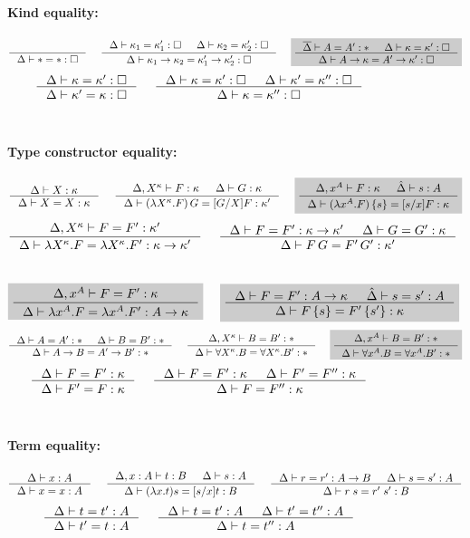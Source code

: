 \begin{figure}
\begin{framed}
\paragraph{Kind equality:}
\[ \inference{}{\Delta |- * = *:\square}
 ~~~~
   \inference{ \Delta |- \kappa_1 = \kappa_1' : \square
             & \Delta |- \kappa_2 = \kappa_2' : \square }
             {\Delta |- \kappa_1 -> \kappa_2 = \kappa_1' -> \kappa_2' : \square}
 ~~~~ \newFi{
   \inference{\overline\Delta |- A=A':* & \Delta |- \kappa=\kappa':\square}
             {\Delta |- A -> \kappa = A' -> \kappa' : \square} }
\]
\[ \inference{\Delta |- \kappa=\kappa':\square}
             {\Delta |- \kappa'=\kappa:\square}
 ~~~~
   \inference{ \Delta |- \kappa =\kappa' :\square
             & \Delta |- \kappa'=\kappa'':\square}
             {\Delta |- \kappa=\kappa'':\square}
\]
~\\
\paragraph{Type constructor equality:}
\[ \inference{\Delta |- X:\kappa }{\Delta |- X=X:\kappa}
 ~~~~
   \inference{\Delta,X^\kappa |- F:\kappa & \Delta |- G:\kappa}
             {\Delta |- (\lambda X^\kappa.F)\,G = [G/X]F:\kappa'}
 ~~~~ \newFi{
   \inference{\Delta,x^A |- F:\kappa & \hat\Delta |- s:A}
             {\Delta |- (\lambda x^A.F)\,\{s\} = [s/x]F:\kappa} }
\]
\[ \inference{\Delta,X^\kappa |- F=F' : \kappa'}
             {\Delta |- \lambda X^\kappa.F=\lambda X^\kappa.F':\kappa-> \kappa'}
 ~~~~
   \inference{\Delta |- F=F':\kappa->\kappa' & \Delta |- G=G':\kappa}
             {\Delta |- F\,G = F'\,G' : \kappa'}
\]
 ~~~~
\[ \newFi{
   \inference{\Delta,x^A |- F=F' : \kappa}
             {\Delta |- \lambda x^A.F=\lambda x^A.F' : A -> \kappa} }
 ~~~~ \newFi{
   \inference{\Delta |- F=F':A->\kappa & \hat\Delta |- s=s':A}
             {\Delta |- F\,\{s\} = F'\,\{s'\} : \kappa} }
\]
\[ \inference{\Delta |- A=A':* & \Delta |- B=B':*}{\Delta |- A-> B=A'-> B':*}
 ~~~~
   \inference{\Delta,X^\kappa |- B=B':*}
             {\Delta |- \forall X^\kappa.B=\forall X^\kappa.B':*}
 ~~~~ \newFi{
   \inference{\Delta,x^A |- B=B':*}
             {\Delta |- \forall x^A.B=\forall x^A.B':*} }
\]
\[ \inference{\Delta |- F = F' : \kappa}{\Delta |- F' = F : \kappa}
 ~~~~
   \inference{\Delta |- F = F' : \kappa & \Delta |- F' = F'' : \kappa}
             {\Delta |- F = F'' : \kappa}
\]
~\\
\paragraph{Term equality:}
\[ \inference{\Delta |- x:A}{\Delta |- x=x:A}
 ~~~~
   \inference{\Delta,x:A |- t:B & \Delta |- s:A}
             {\Delta |- (\lambda x.t)s=[s/x]t : B}
 ~~~~
   \inference{\Delta |- r=r':A-> B & \Delta |- s=s':A}{\Delta |- r\;s=r'\;s':B}
\]
\[ \inference{\Delta |- t=t':A}{\Delta |- t'=t:A}
 ~~~~
   \inference{\Delta |- t=t':A & \Delta |- t'=t'':A}{\Delta |- t=t'':A}
\]
~\\

\end{framed}
\end{figure}
